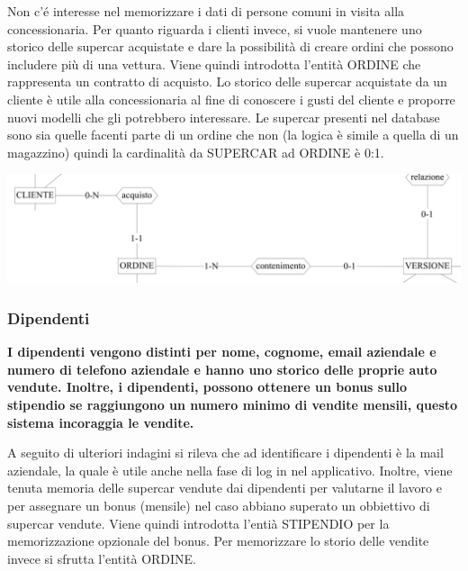 \documentclass[11pt]{article}
\begin{document}
Non c'é interesse nel memorizzare i dati di persone comuni in visita alla
concessionaria. Per quanto riguarda i clienti invece, si vuole mantenere uno
storico delle supercar acquistate e dare la possibilità di creare ordini che
possono includere più di una vettura. Viene quindi introdotta l'entità ORDINE
che rappresenta un contratto di acquisto. Lo storico delle supercar acquistate
da un cliente è utile alla concessionaria al fine di conoscere i gusti del
cliente e proporre nuovi modelli che gli potrebbero interessare. Le supercar
presenti nel database sono sia quelle facenti parte di un ordine che non (la
logica è simile a quella di un magazzino) quindi la cardinalità da SUPERCAR ad
ORDINE è 0:1.

\begin{center}
    \includegraphics[width=\linewidth]{images/partialSchemes/ordine.png}
\end{center}

\subsubsection{Dipendenti}
\textbf{I dipendenti vengono distinti per nome, cognome, email aziendale e numero di
telefono aziendale e hanno uno storico delle proprie auto vendute. Inoltre, i
dipendenti, possono ottenere un bonus sullo stipendio se raggiungono un numero
minimo di vendite mensili, questo sistema incoraggia le vendite.}

A seguito di ulteriori indagini si rileva che ad identificare i dipendenti è la
mail aziendale, la quale è utile anche nella fase di log in nel applicativo.
Inoltre, viene tenuta memoria delle supercar vendute dai dipendenti per
valutarne il lavoro e per assegnare un bonus (mensile) nel caso abbiano superato
un obbiettivo di supercar vendute. Viene quindi introdotta l'entià STIPENDIO per
la memorizzazione opzionale del bonus. Per memorizzare lo storio delle vendite
invece si sfrutta l'entità ORDINE.
\end{document}

